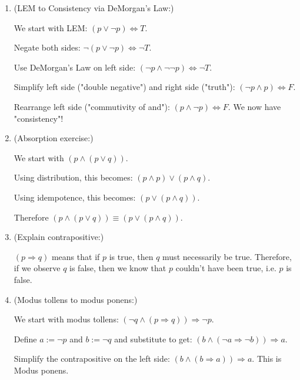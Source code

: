\documentclass{article}
\begin{document}
\begin{enumerate}[label=\alph*)]
    \item 
    (LEM to Consistency via DeMorgan's Law:)
    
    We start with LEM: $(p \lor \lnot p) \Leftrightarrow T$.
    
    Negate both sides: $\lnot(p \lor \lnot p) \Leftrightarrow \lnot T$.
    
    Use DeMorgan's Law on left side: $(\lnot p \land \lnot \lnot p) \Leftrightarrow \lnot T$.
    
    Simplify left side ("double negative") and right side ("truth"): $(\lnot p \land p) \Leftrightarrow F$.
    
    Rearrange left side ("commutivity of and"): $(p \land \lnot p) \Leftrightarrow F$. We now have "consistency"!
    
    \item
    (Absorption exercise:)
    
    We start with $(p \land (p \lor q))$.
    
    Using distribution, this becomes: $(p \land p) \lor (p \land q)$.
    
    Using idempotence, this becomes: $(p \lor (p \land q))$. 
    
    Therefore $(p \land (p \lor q)) \equiv (p \lor (p \land q))$.
    
    \item
    (Explain contrapositive:)
    
    $(p \Rightarrow q)$ means that if $p$ is true, then $q$ must necessarily be true. Therefore, if we observe $q$ is false, then we know that $p$ couldn't have been true, i.e. $p$ is false. 
    
    \item
    (Modus tollens to modus ponens:)
    
    We start with modus tollens: $(\lnot q \land (p \Rightarrow q)) \Rightarrow \lnot p$.
    
    Define $a := \lnot p$ and $b := \lnot q$ and substitute to get: $(b \land (\lnot a \Rightarrow \lnot b)) \Rightarrow a$.
    
    Simplify the contrapositive on the left side: $(b \land (b \Rightarrow a)) \Rightarrow a$. This is Modus ponens.
    
\end{enumerate}

\end{document}
